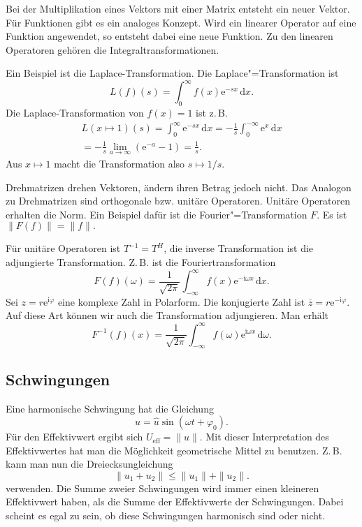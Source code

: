 \documentclass[a4paper,10pt,fleqn,twocolumn,twoside]{article}
\numberwithin{equation}{section}
\newcommand{\ui}{\mathrm i}
\newcommand{\ee}{\mathrm e}
\begin{document}
Bei der Multiplikation eines Vektors mit einer Matrix entsteht ein
neuer Vektor. Für Funktionen gibt es ein analoges Konzept. Wird ein
linearer Operator auf eine Funktion angewendet, so entsteht dabei
eine neue Funktion. Zu den linearen Operatoren gehören die
Integraltransformationen.

Ein Beispiel ist die Laplace-Transformation.
Die Laplace"=Transformation ist
\begin{equation}
L(f)(s) = \int_0^{\infty} f(x)\ee^{-sx}\,\mathrm dx.
\end{equation}
Die Laplace-Transformation von $f(x)=1$ ist z.\,B.
\begin{gather*}
L(x\mapsto 1)(s) = \int_0^{\infty} \ee^{-sx}\,\mathrm dx
= -\frac{1}{s} \int_0^{-\infty} \ee^x\,\mathrm dx\\
= -\frac{1}{s} \lim_{a\rightarrow\infty} (\ee^{-a}-1)
= \frac{1}{s}.
\end{gather*}
Aus $x\mapsto 1$ macht die Transformation also
$s\mapsto 1/s$.

Drehmatrizen drehen Vektoren, ändern ihren Betrag jedoch nicht.
Das Analogon zu Drehmatrizen sind orthogonale bzw. unitäre Operatoren.
Unitäre Operatoren erhalten die Norm. Ein Beispiel dafür ist die
Fourier"=Transformation $F$. Es ist $\|F(f)\| = \|f\|.$

Für unitäre Operatoren ist $T^{-1}=T^H$, die inverse Transformation
ist die adjungierte Transformation. Z.\,B. ist die Fouriertransformation
\begin{equation}
F(f)(\omega) = \frac{1}{\sqrt{2\pi}}
\int_{-\infty}^{\infty} f(x)\ee^{-\ui \omega x}\,\mathrm dx.
\end{equation}
Sei $z=r\ee^{\ui\varphi}$ eine komplexe Zahl in Polarform.
Die konjugierte Zahl ist
$\overline z = r\ee^{-\ui\varphi}$. Auf diese Art können wir auch
die Transformation adjungieren. Man erhält
\begin{equation}
F^{-1}(f)(x) = \frac{1}{\sqrt{2\pi}}
\int_{-\infty}^{\infty} f(\omega)\ee^{\ui\omega x}\,\mathrm d\omega.
\end{equation}

\subsection{Schwingungen}

Eine harmonische Schwingung hat die Gleichung
\begin{equation}
u=\hat u\sin(\omega t+\varphi_0).
\end{equation}
Für den Effektivwert ergibt sich $U_\mathrm{eff} = \|u\|$.
Mit dieser Interpretation des Effektivwertes hat man die Möglichkeit
geometrische Mittel zu benutzen. Z.\,B. kann man nun die
Dreiecksungleichung
\begin{equation}
\|u_1+u_2\| \le \|u_1\|+\|u_2\|.
\end{equation}
verwenden. Die Summe zweier Schwingungen wird immer einen kleineren
Effektivwert haben, als die Summe der Effektivwerte der Schwingungen.
Dabei scheint es egal zu sein, ob diese Schwingungen harmonisch sind
oder nicht.
\end{document}
